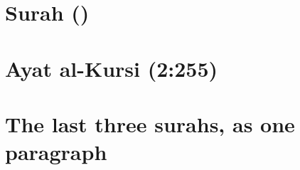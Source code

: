\documentclass{article}
\begin{document}
\section*{Surah \surahname[1] (\textarab[utf]{\surahname*[1]})}
\begin{arab}[utf]
  \quransurah[1]
\end{arab}

\section*{Ayat al-Kursi (2:255)}
\begin{arab}[utf]
  \quranayah[Al-Baqara][255]
\end{arab}

\section*{The last three surahs, as one paragraph}
\begin{arab}[utf]
  \quransurah*[112-114]
\end{arab}
\end{document}
